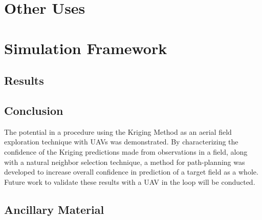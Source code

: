 \documentclass[11pt]{ucthesis}
\begin{document}
\part{Other Uses}

\part{Simulation Framework}

\chapter{Results}

\chapter{Conclusion}
The potential in a procedure using the Kriging Method as an aerial field exploration technique with UAVs was demonstrated. By characterizing the confidence of the Kriging predictions made from observations in a field, along with a natural neighbor selection technique, a method for path-planning was developed to increase overall confidence in prediction of a target field as a whole. Future work to validate these results with a UAV in the loop will be conducted.

\nocite{*}



\appendix
\chapter{Ancillary Material}
\end{document}
